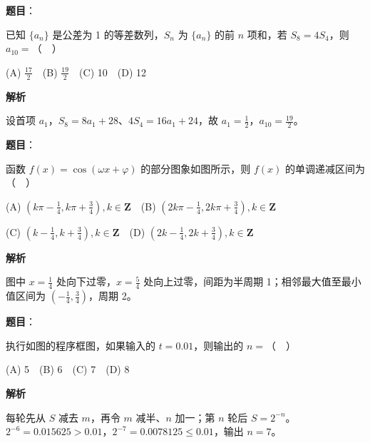 \begin{answer}

\textbf{题目}：

已知 $\{a_n\}$ 是公差为 1 的等差数列，$S_n$ 为 $\{a_n\}$ 的前 $n$ 项和，若 $S_8=4S_4$，则 $a_{10}=$（　）

(A) $\frac{17}2$　(B) $\frac{19}2$　(C) 10　(D) 12

\textbf{解析}

设首项 $a_1$，$S_8=8a_1+28$、$4S_4=16a_1+24$，故 $a_1=\frac12$，$a_{10}=\frac{19}2$。


\end{answer}
\begin{answer}

\textbf{题目}：

函数 $f(x)=\cos(\omega x+\varphi)$ 的部分图象如图所示，则 $f(x)$ 的单调递减区间为（　）
\nopagebreak[4]
\begin{center}\end{center}
\nopagebreak[4]
(A) $(k\pi-\frac14,k\pi+\frac34),k\in\mathbf Z$　(B) $(2k\pi-\frac14,2k\pi+\frac34),k\in\mathbf Z$

(C) $(k-\frac14,k+\frac34),k\in\mathbf Z$　(D) $(2k-\frac14,2k+\frac34),k\in\mathbf Z$

\textbf{解析}

图中 $x=\frac14$ 处向下过零，$x=\frac54$ 处向上过零，间距为半周期 1；相邻最大值至最小值区间为 $(-\frac14,\frac34)$，周期 2。


\end{answer}
\begin{answer}

\textbf{题目}：

执行如图的程序框图，如果输入的 $t=0.01$，则输出的 $n=$（　）
\nopagebreak[4]
\begin{center}\end{center}
\nopagebreak[4]
(A) 5　(B) 6　(C) 7　(D) 8

\textbf{解析}

每轮先从 $S$ 减去 $m$，再令 $m$ 减半、$n$ 加一；第 $n$ 轮后 $S=2^{-n}$。$2^{-6}=0.015625>0.01$，$2^{-7}=0.0078125\leq0.01$，输出 $n=7$。


\end{answer}

